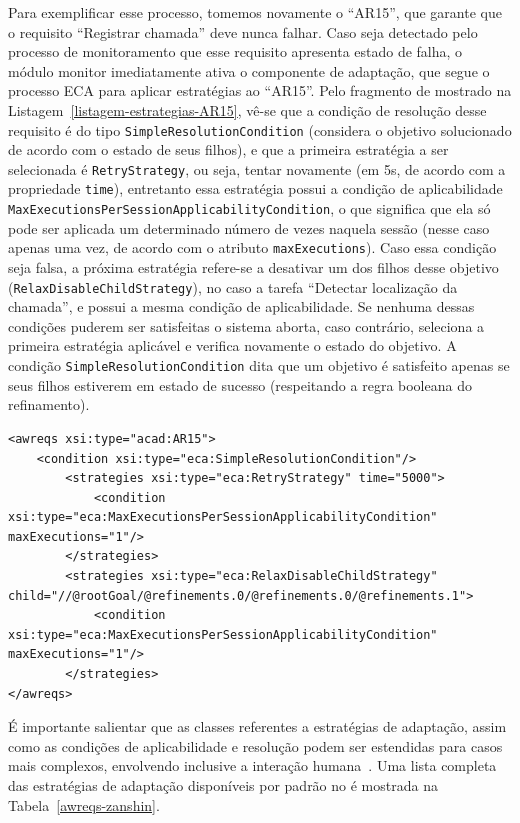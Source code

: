 Para exemplificar esse processo, tomemos novamente o \awreq ``AR15'', que garante que o requisito ``Registrar chamada'' deve nunca falhar. Caso seja detectado pelo processo de monitoramento que esse requisito apresenta estado de falha, o módulo monitor imediatamente ativa o componente de adaptação, que segue o processo ECA para aplicar estratégias ao ``AR15''. Pelo fragmento de \xml mostrado na Listagem~\ref{listagem-estrategias-AR15}, vê-se que a condição de resolução desse requisito é do tipo \texttt{SimpleResolutionCondition} (considera o objetivo solucionado de acordo com o estado de seus filhos), e que a primeira estratégia a ser selecionada é \texttt{RetryStrategy}, ou seja, tentar novamente (em 5s, de acordo com a propriedade \texttt{time}), entretanto essa estratégia possui a condição de aplicabilidade \texttt{MaxExecutionsPerSessionApplicabilityCondition}, o que significa que ela só pode ser aplicada um determinado número de vezes naquela sessão (nesse caso apenas uma vez, de acordo com o atributo \texttt{maxExecutions}). Caso essa condição seja falsa, a próxima estratégia refere-se a desativar um dos filhos desse objetivo (\texttt{RelaxDisableChildStrategy}), no caso a tarefa ``Detectar localização da chamada'', e possui a mesma condição de aplicabilidade. Se nenhuma dessas condições puderem ser satisfeitas o sistema aborta, caso contrário, seleciona a primeira estratégia aplicável e verifica novamente o estado do objetivo. A condição \texttt{SimpleResolutionCondition} dita que um objetivo é satisfeito apenas se seus filhos estiverem em estado de sucesso (respeitando a regra booleana do refinamento). 

\begin{lstlisting}[caption={Estratégias de adaptação de AR15},label={listagem-estrategias-AR15}]
<awreqs xsi:type="acad:AR15">										
	<condition xsi:type="eca:SimpleResolutionCondition"/>
		<strategies xsi:type="eca:RetryStrategy" time="5000">
			<condition xsi:type="eca:MaxExecutionsPerSessionApplicabilityCondition" maxExecutions="1"/>
		</strategies>
		<strategies xsi:type="eca:RelaxDisableChildStrategy" child="//@rootGoal/@refinements.0/@refinements.0/@refinements.1">
			<condition xsi:type="eca:MaxExecutionsPerSessionApplicabilityCondition" maxExecutions="1"/>
		</strategies>
</awreqs>
\end{lstlisting}

É importante salientar que as classes referentes a estratégias de adaptação, assim como as condições de aplicabilidade e resolução podem ser estendidas para casos mais complexos, envolvendo inclusive a interação humana~\cite{tesevitor}. Uma lista completa das estratégias de adaptação disponíveis por padrão no \zanshin é mostrada na Tabela~\ref{awreqs-zanshin}.

